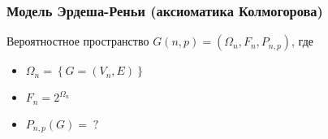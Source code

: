 \frametitle{Модель Эрдеша-Реньи (аксиоматика Колмогорова)} 


\begin{rdefinition}   
    Вероятностное пространство $G(n, p) = \left(\Omega_n, F_n, P_{n, p}\right)$, где \\
    \begin{itemize}
        \item $\Omega_n = \left\{G = \left(V_n, E\right)\right\}$
        \item $F_n = 2^{\Omega_n}$
        \item $P_{n, p}\left(G\right) = \;?$
    \end{itemize}
\end{rdefinition}
